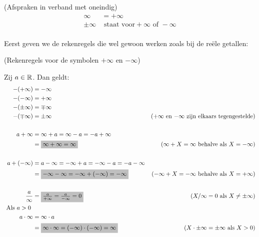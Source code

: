 \documentclass{ximera}
\begin{document}
\begin{notation} (Afspraken in verband met oneindig)	
	\begin{align*}
	\infty & = +\infty   \\
	\pm\infty &\text{ staat voor} +\infty \text{ of } -\infty \\
	\end{align*}
\end{notation}


Eerst geven we de rekenregels die wel gewoon werken zoals bij de reële getallen:


\begin{proposition} (Rekenregels voor de symbolen $+\infty$ en $-\infty$)

	Zij $a\in\mathbb{R}$. Dan geldt:	
	\begin{align*}
	-(+\infty) & = -\infty \\
	-(-\infty) & = +\infty  \\
	-(\pm\infty) &= \mp\infty \\
	-(\mp\infty) &= \pm\infty & \text{($+\infty$ en $-\infty$ zijn elkaars tegengestelde)}\\ 
	\\
	a+\infty & = \infty+a = \infty - a = -a +\infty \\
	& = \important{\infty + \infty = \infty} & \text{($\infty + X =\infty$ behalve als $X=-\infty$)} \\
	\\
	a+(-\infty) & = a-\infty = -\infty+a =-\infty - a = -a - \infty \\
	& = \important{-\infty - \infty = -\infty+(-\infty) = -\infty} & \text{($-\infty+X=-\infty$ behalve als $X=+\infty$)} \\
	\\
		\frac{a}{\infty} & = \important{\frac{a}{+\infty} = \frac{a}{-\infty} = 0} & (X/\infty = 0 \text{ als } X\neq \pm\infty) \\
	\mbox{ Als $a>0$ }\\%
	a\cdot\infty & = \infty\cdot a \\
	& = \important{\infty \cdot \infty = (-\infty) \cdot (-\infty) = \infty} & \text{($X\cdot\pm\infty=\pm\infty$ als $X>0$)} \\

\end{align*}
\end{proposition}
\end{document}
